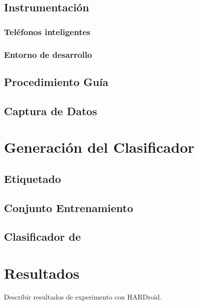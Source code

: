 \subsection{Instrumentación}

\subsubsection{Teléfonos inteligentes}

\subsubsection{Entorno de desarrollo }

\subsection{Procedimiento Guía }

\subsection{Captura de Datos}

\section{Generación del Clasificador }

\label{sec6:clasificacion}

\subsection{Etiquetado}

\subsection{Conjunto Entrenamiento }

\subsection{Clasificador de }

\section{Resultados}

\label{sec6:resultados}Describir resultados de experimento con HARDroid.
